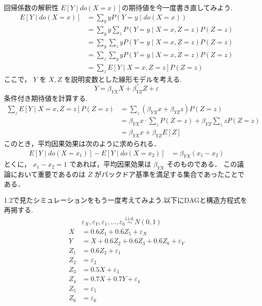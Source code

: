 \documentclass[uplatex, dvipdfmx]{jsarticle}
\begin{document}
\newpage
\begin{exm}{回帰係数の解釈性}
  $E[Y \mid do(X=x)]$の期待値を今一度書き直してみよう.
  \begin{align}
    E[Y \mid do(X=x)] &= \sum_y y P(Y=y \mid do(X=x)) \\
    &= \sum_y y \sum_z P(Y=y \mid X=x, Z=z) P(Z=z) \\
    &= \sum_y \sum_z y P(Y=y \mid X=x, Z=z) P(Z=z) \\
    &= \sum_z \sum_y y P(Y=y \mid X=x, Z=z) P(Z=z) \\
    &= \sum_z E[Y \mid X=x, Z=z] P(Z=z)
  \end{align}
  ここで， $Y$ を $X, Z$ を説明変数とした線形モデルを考える.
  \begin{equation}
    Y = \beta_{YX} X + \beta_{YZ}^{\top} Z + \varepsilon
  \end{equation}
  条件付き期待値を計算する.
  \begin{align}
    \sum_z E[Y \mid X=x, Z=z] P(Z=z) &= \sum_z (\beta_{YX} x + \beta_{YZ} z) P(Z=z) \\
    &= \beta_{YX} x \cdot \sum_z P(Z=z) + \beta_{YZ} \sum_z z P(Z=z) \\
    &= \beta_{YX} x + \beta_{YZ} E[Z]
  \end{align}
  このとき，平均因果効果は次のように求められる．
  \begin{align}
    E[Y \mid do(X=x_1)] - E[Y \mid do(X=x_2)] &= \beta_{YX} (x_1 - x_2)
  \end{align}
  とくに， $x_1 - x_2 = 1$ であれば，平均因果効果は $\beta_{YX}$ そのものである．
  この議論において重要であるのは $Z$ がバックドア基準を満足する集合であったことである．
  
  1.2で見たシミュレーションをもう一度考えてみよう.以下にDAGと構造方程式を再掲する.
  \begin{align}
    &\varepsilon_X, \varepsilon_Y, \varepsilon_1, \dots, \varepsilon_6 \overset{\text{i.i.d.}}{\sim} N(0, 1) \\
    X  &= 0.6Z_1 + 0.6Z_5 + \varepsilon_X \\
    Y  &= X + 0.6Z_2 + 0.6Z_3 + 0.6Z_6 + \varepsilon_Y \\
    Z_1 &= 0.6Z_2 + \varepsilon_1 \\
    Z_2 &= \varepsilon_2 \\
    Z_3 &= 0.5X + \varepsilon_3 \\
    Z_4 &= 0.7X + 0.7Y + \varepsilon_4 \\
    Z_5 &= \varepsilon_5 \\
    Z_6 &= \varepsilon_6 
  \end{align}
  \begin{figure}[H]
    \centering
\end{figure}
\end{exm}
\end{document}
